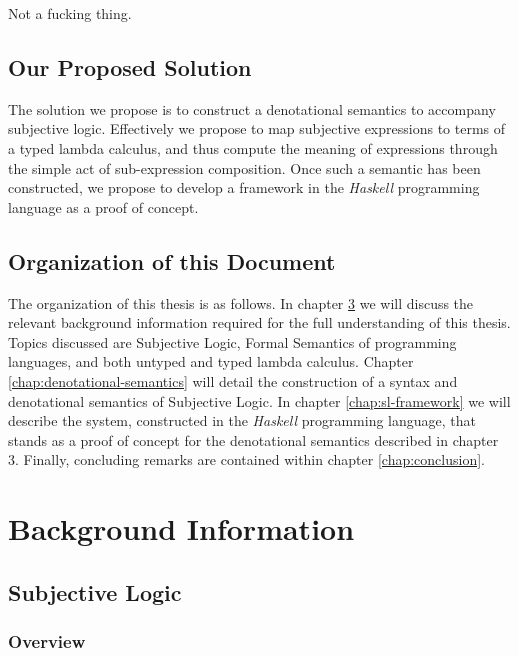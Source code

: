\documentclass[a4paper]{report}
\begin{document}
Not a fucking thing. %


\section{Our Proposed Solution}

The solution we propose is to construct a denotational semantics to accompany subjective logic.
Effectively we propose to map subjective expressions to terms of a typed lambda calculus, and thus
compute the meaning of expressions through the simple act of sub-expression composition. Once such
a semantic has been constructed, we propose to develop a framework in the \emph{Haskell} programming
language as a proof of concept.


\section{Organization of this Document}

The organization of this thesis is as follows. In chapter \ref{chap:background-information}
we will discuss the relevant background
information required for the full understanding of this thesis. Topics discussed are Subjective Logic,
Formal Semantics of programming languages, and both untyped and typed lambda calculus.
Chapter \ref{chap:denotational-semantics} will
detail the construction of a syntax and denotational semantics of Subjective Logic. In
chapter \ref{chap:sl-framework} we
will describe the system, constructed in the \emph{Haskell} programming language, that stands as a
proof of concept for the denotational semantics described in chapter 3. Finally, concluding remarks
are contained within chapter \ref{chap:conclusion}.





\chapter{Background Information}
\label{chap:background-information}

\section{Subjective Logic}

\subsection{Overview}
\end{document}
